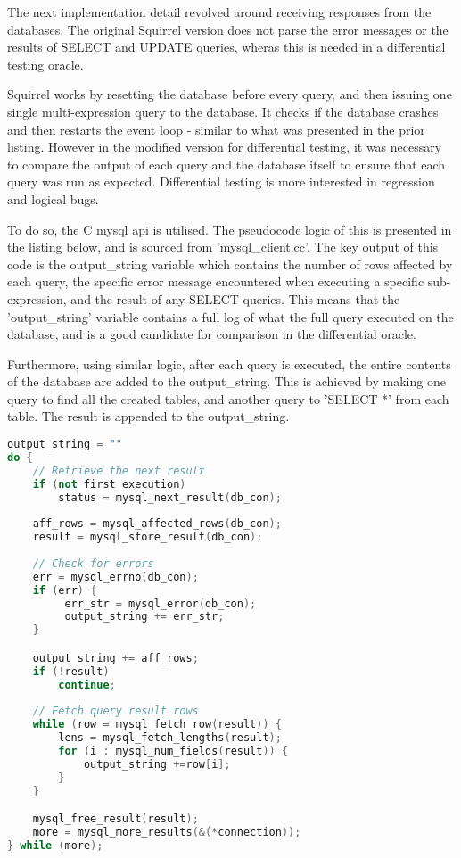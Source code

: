 \documentclass[sigconf]{acmart}
\begin{document}
The next implementation detail revolved around receiving responses from the databases. The original Squirrel version does not parse the error messages or the results of SELECT and UPDATE queries, wheras this is needed in a differential testing oracle.

Squirrel works by resetting the database before every query, and then issuing one single multi-expression query to the database. It checks if the database crashes and then restarts the event loop - similar to what was presented in the prior listing. However in the modified version for differential testing, it was necessary to compare the output of each query and the database itself to ensure that each query was run as expected. Differential testing is more interested in regression and logical bugs.

To do so, the C mysql api is utilised. The pseudocode logic of this is presented in the listing below, and is sourced from 'mysql\_client.cc'. The key output of this code is the output\_string variable which contains the number of rows affected by each query, the specific error message encountered when executing a specific sub-expression, and the result of any SELECT queries. This means that the 'output\_string' variable contains a full log of what the full query executed on the database, and is a good candidate for comparison in the differential oracle.

Furthermore, using similar logic, after each query is executed, the entire contents of the database are added to the output\_string. This is achieved by making one query to find all the created tables, and another query to 'SELECT *' from each table. The result is appended to the output\_string. 

\begin{lstlisting}[language=C++, caption={mysql\_client.cc Result Processing Code}, label={lst:resultProcessing}]
output_string = ""
do {
    // Retrieve the next result
    if (not first execution)
        status = mysql_next_result(db_con);
    
    aff_rows = mysql_affected_rows(db_con);
    result = mysql_store_result(db_con);
    
    // Check for errors 
    err = mysql_errno(db_con);
    if (err) {
         err_str = mysql_error(db_con);
         output_string += err_str;
    }

    output_string += aff_rows;
    if (!result)
        continue;
        
    // Fetch query result rows
    while (row = mysql_fetch_row(result)) {
        lens = mysql_fetch_lengths(result);
        for (i : mysql_num_fields(result)) {
            output_string +=row[i];
        }
    }

    mysql_free_result(result);
    more = mysql_more_results(&(*connection));
} while (more);
\end{lstlisting}
\end{document}
